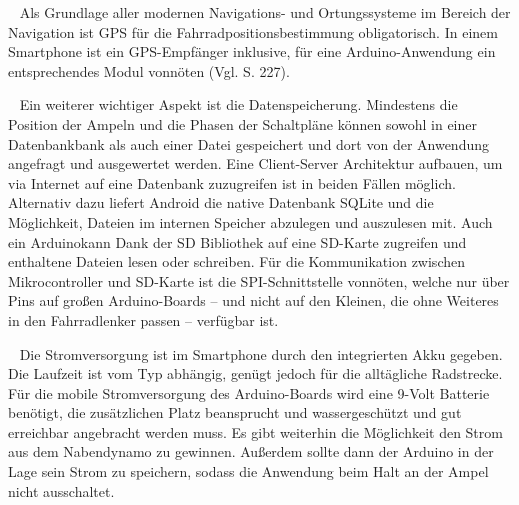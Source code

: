 \begin{description}[leftmargin=0.7cm,style=nextline]
  \item[\gls{GPS}] ~ Als Grundlage aller modernen Navigations- und Ortungssysteme im Bereich der Navigation ist \gls{GPS} für die Fahrradpositionsbestimmung obligatorisch. In einem \gls{Smartphone} ist ein \gls{GPS}-Empfänger inklusive, für eine \gls{Arduino}-Anwendung ein entsprechendes Modul vonnöten (Vgl. \cite{arduino} S. 227).\\
 \item[Datenspeicherung] ~ Ein weiterer wichtiger Aspekt ist die Datenspeicherung. Mindestens die Position der Ampeln und die Phasen der Schaltpläne können sowohl in einer Datenbankbank als auch einer Datei gespeichert und dort von der Anwendung angefragt und ausgewertet werden. Eine Client-Server Architektur aufbauen, um via Internet auf eine Datenbank zuzugreifen ist in beiden Fällen möglich. Alternativ dazu liefert Android die native Datenbank SQLite und die Möglichkeit, Dateien im internen Speicher abzulegen und auszulesen mit. Auch ein \gls{Arduino}kann Dank der SD Bibliothek auf eine SD-Karte zugreifen und enthaltene Dateien lesen oder schreiben. Für die Kommunikation zwischen Mikrocontroller und SD-Karte ist die SPI-Schnittstelle vonnöten, welche nur über Pins auf großen \gls{Arduino}-Boards -- und nicht auf den Kleinen, die ohne Weiteres in den Fahrradlenker passen -- verfügbar ist.\cite{arduino_sd}\\
  \item[Stromversorgung] ~ Die Stromversorgung ist im \gls{Smartphone} durch den integrierten Akku gegeben. Die Laufzeit ist vom Typ abhängig, genügt jedoch für die alltägliche Radstrecke. Für die mobile Stromversorgung des \gls{Arduino}-Boards wird eine 9-Volt Batterie benötigt, die zusätzlichen Platz beansprucht und wassergeschützt und gut erreichbar angebracht werden muss. Es gibt weiterhin die Möglichkeit den Strom aus dem Nabendynamo zu gewinnen. Außerdem sollte dann der \gls{Arduino} in der Lage sein Strom zu speichern, sodass die Anwendung beim Halt an der Ampel nicht ausschaltet.\\

\end{description}
